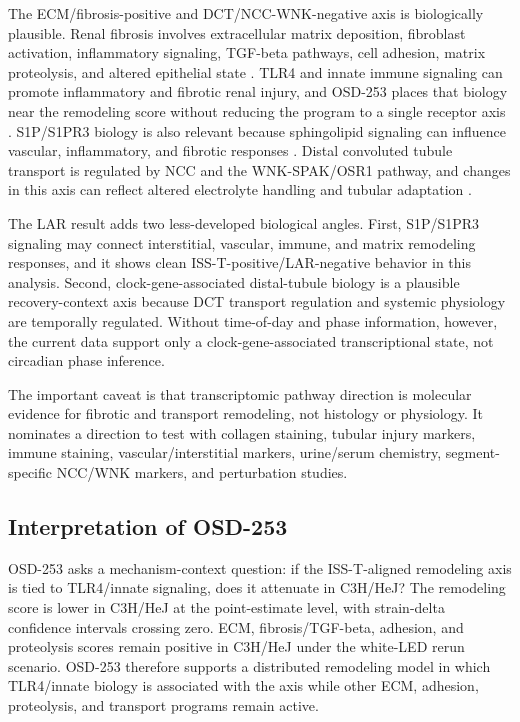 \documentclass[11pt]{article}
\begin{document}
The ECM/fibrosis-positive and DCT/NCC-WNK-negative axis is biologically plausible. Renal fibrosis involves extracellular matrix deposition, fibroblast activation, inflammatory signaling, TGF-beta pathways, cell adhesion, matrix proteolysis, and altered epithelial state \citep{liu2011fibrosis,natneph2024fibrosis,jci2024fibrosis,chavula2022cadherin}. TLR4 and innate immune signaling can promote inflammatory and fibrotic renal injury, and OSD-253 places that biology near the remodeling score without reducing the program to a single receptor axis \citep{souza2015tlr4,carpenter2009tril,carpenter2011tril,wochal2014tril}. S1P/S1PR3 biology is also relevant because sphingolipid signaling can influence vascular, inflammatory, and fibrotic responses \citep{s1p2017,s1p2020,s1p2009}. Distal convoluted tubule transport is regulated by NCC and the WNK-SPAK/OSR1 pathway, and changes in this axis can reflect altered electrolyte handling and tubular adaptation \citep{castaneda2024dct,ge2016wnk}.

The LAR result adds two less-developed biological angles. First, S1P/S1PR3 signaling may connect interstitial, vascular, immune, and matrix remodeling responses, and it shows clean ISS-T-positive/LAR-negative behavior in this analysis. Second, clock-gene-associated distal-tubule biology is a plausible recovery-context axis because DCT transport regulation and systemic physiology are temporally regulated. Without time-of-day and phase information, however, the current data support only a clock-gene-associated transcriptional state, not circadian phase inference.

The important caveat is that transcriptomic pathway direction is molecular evidence for fibrotic and transport remodeling, not histology or physiology. It nominates a direction to test with collagen staining, tubular injury markers, immune staining, vascular/interstitial markers, urine/serum chemistry, segment-specific NCC/WNK markers, and perturbation studies.

\subsection{Interpretation of OSD-253}

OSD-253 asks a mechanism-context question: if the ISS-T-aligned remodeling axis is tied to TLR4/innate signaling, does it attenuate in C3H/HeJ? The remodeling score is lower in C3H/HeJ at the point-estimate level, with strain-delta confidence intervals crossing zero. ECM, fibrosis/TGF-beta, adhesion, and proteolysis scores remain positive in C3H/HeJ under the white-LED rerun scenario. OSD-253 therefore supports a distributed remodeling model in which TLR4/innate biology is associated with the axis while other ECM, adhesion, proteolysis, and transport programs remain active.
\end{document}
